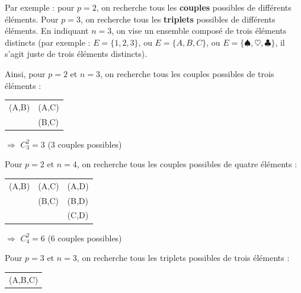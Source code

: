 \documentclass[11pt,a4paper]{article}
\begin{document}
\bigskip

Par exemple : pour $ p = 2 $, on recherche tous les \textbf{couples} possibles de différents éléments.
Pour $ p = 3 $, on recherche tous les \textbf{triplets} possibles de différents éléments.
En indiquant $ n = 3 $, on vise un ensemble composé de trois éléments distincts (par exemple : $ E = \{ 1, 2, 3 \} $, ou $ E = \{ A, B, C \} $, ou $ E = \{ \spadesuit, \heartsuit, \clubsuit \} $, il s'agit juste de trois éléments distincts).

\bigskip

Ainsi, pour $ p = 2 $ et $ n = 3 $, on recherche tous les couples possibles de trois éléments :

\begin{table}[h!]
  \centering
  \begin{tabular}{l l}
(A,B) & (A,C) \\
      & (B,C)
  \end{tabular}
\end{table}

\hspace*{3cm} $\Rightarrow$ $ C^{2}_{3} = 3 $ \hspace*{1cm} (3 couples possibles)

\bigskip

Pour $ p = 2 $ et $ n = 4 $, on recherche tous les couples possibles de quatre éléments :

\begin{table}[h!]
  \centering
  \begin{tabular}{l l l}
(A,B) & (A,C) & (A,D) \\
      & (B,C) & (B,D) \\
      &       & (C,D)
  \end{tabular}
\end{table}

\hspace*{3cm} $\Rightarrow$ $ C^{2}_{4} = 6 $ \hspace*{1cm} (6 couples possibles)

\newpage

Pour $ p = 3 $ et $ n = 3 $, on recherche tous les triplets possibles de trois éléments :

\begin{table}[h!]
  \centering
  \begin{tabular}{l}
(A,B,C) \\
  \end{tabular}
\end{table}
\end{document}
